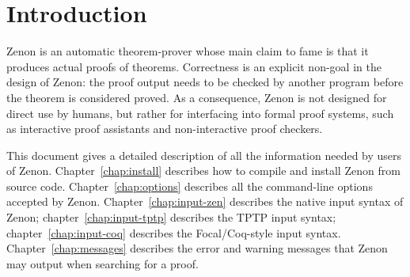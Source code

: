 
\chapter{Introduction}\label{chap:intro}

Zenon is an automatic theorem-prover whose main claim to fame is that
it produces actual proofs of theorems.
Correctness is an explicit non-goal in the design of Zenon: the proof
output needs to be checked by another program before the theorem is
considered proved.
  As a consequence, Zenon is not
designed for direct use by humans, but rather for interfacing into
formal proof systems, such as interactive proof assistants and
non-interactive proof checkers.

This document gives a detailed description of all the information
needed by users of Zenon.  Chapter~\ref{chap:install} describes how to
compile and install Zenon from source code.  Chapter~\ref{chap:options}
describes all the command-line options accepted by Zenon.
Chapter~\ref{chap:input-zen} describes the native input syntax of
Zenon; chapter~\ref{chap:input-tptp} describes the TPTP input syntax;
chapter~\ref{chap:input-coq} describes the Focal/Coq-style input
syntax.  Chapter~\ref{chap:messages} describes the error and warning
messages that Zenon may output when searching for a proof.
